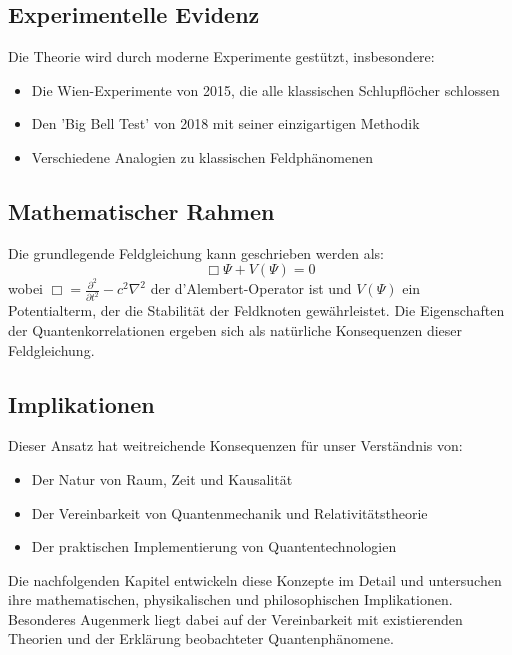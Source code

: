\documentclass[12pt,a4paper]{article}
\begin{document}
\subsection{Experimentelle Evidenz}

Die Theorie wird durch moderne Experimente gestützt, insbesondere:
\begin{itemize}
	\item Die Wien-Experimente von 2015, die alle klassischen Schlupflöcher schlossen
	\item Den 'Big Bell Test' von 2018 mit seiner einzigartigen Methodik
	\item Verschiedene Analogien zu klassischen Feldphänomenen
\end{itemize}

\subsection{Mathematischer Rahmen}

Die grundlegende Feldgleichung kann geschrieben werden als:
\begin{equation}
	\Box \Psi + V(\Psi) = 0
\end{equation}
wobei $\Box = \frac{\partial^2}{\partial t^2} - c^2 \nabla^2$ der d'Alembert-Operator ist und $V(\Psi)$ ein Potentialterm, der die Stabilität der Feldknoten gewährleistet. Die Eigenschaften der Quantenkorrelationen ergeben sich als natürliche Konsequenzen dieser Feldgleichung.

\subsection{Implikationen}

Dieser Ansatz hat weitreichende Konsequenzen für unser Verständnis von:
\begin{itemize}
	\item Der Natur von Raum, Zeit und Kausalität
	\item Der Vereinbarkeit von Quantenmechanik und Relativitätstheorie
	\item Der praktischen Implementierung von Quantentechnologien
\end{itemize}

Die nachfolgenden Kapitel entwickeln diese Konzepte im Detail und untersuchen ihre mathematischen, physikalischen und philosophischen Implikationen. Besonderes Augenmerk liegt dabei auf der Vereinbarkeit mit existierenden Theorien und der Erklärung beobachteter Quantenphänomene.
\end{document}
